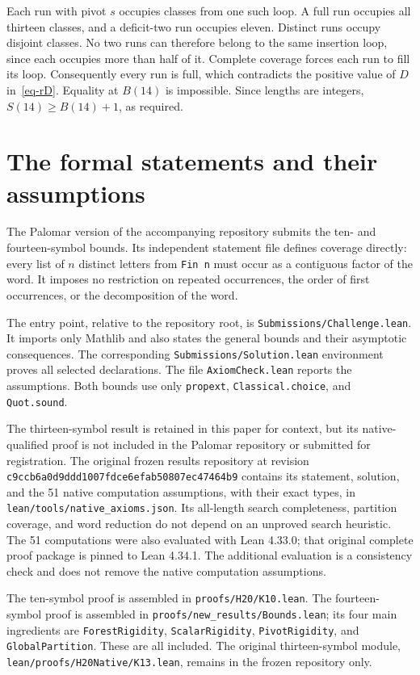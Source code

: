 \documentclass[11pt]{article}
\begin{document}
Each run with pivot $s$ occupies classes from one such loop. A full
run occupies all thirteen classes, and a deficit-two run occupies
eleven. Distinct runs occupy disjoint classes. No two runs can therefore
belong to the same insertion loop, since each occupies more than half
of it. Complete coverage forces each run to fill its loop. Consequently
every run is full, which contradicts the positive value of $D$
in~\eqref{eq-rD}. Equality at $B(14)$ is impossible. Since lengths are
integers, $S(14)\ge B(14)+1$, as required.

\section{The formal statements and their assumptions}
The Palomar version of the accompanying repository submits the ten- and
fourteen-symbol bounds. Its independent statement file defines coverage
directly: every list of $n$ distinct letters from \texttt{Fin n} must
occur as a contiguous factor of the word. It imposes no restriction on
repeated occurrences, the order of first occurrences, or the decomposition
of the word.

The entry point, relative to the repository root, is
\nolinkurl{Submissions/Challenge.lean}. It imports only Mathlib and
also states the general bounds and their asymptotic consequences. The
corresponding \nolinkurl{Submissions/Solution.lean} environment proves
all selected declarations. The file \nolinkurl{AxiomCheck.lean} reports the
assumptions. Both bounds use only \texttt{propext},
\nolinkurl{Classical.choice}, and \nolinkurl{Quot.sound}.

The thirteen-symbol result is retained in this paper for context, but
its native-qualified proof is not included in the Palomar repository
or submitted for registration. The original frozen results repository
at revision \nolinkurl{c9ccb6a0d9ddd1007fdce6efab50807ec47464b9}
contains its statement, solution, and the 51 native computation
assumptions, with their exact types, in
\nolinkurl{lean/tools/native_axioms.json}. Its all-length search
completeness, partition coverage, and word reduction do not depend on
an unproved search heuristic. The 51 computations were also evaluated
with Lean 4.33.0; that original complete proof package is pinned to
Lean 4.34.1. The additional evaluation is a consistency check and does
not remove the native computation assumptions.

The ten-symbol proof is assembled in \nolinkurl{proofs/H20/K10.lean}.
The fourteen-symbol proof is assembled in
\nolinkurl{proofs/new_results/Bounds.lean}; its four main ingredients are
\texttt{ForestRigidity}, \texttt{ScalarRigidity}, \texttt{PivotRigidity},
and \texttt{GlobalPartition}. These are all included. The original
thirteen-symbol module, \nolinkurl{lean/proofs/H20Native/K13.lean},
remains in the frozen repository only.
\end{document}
